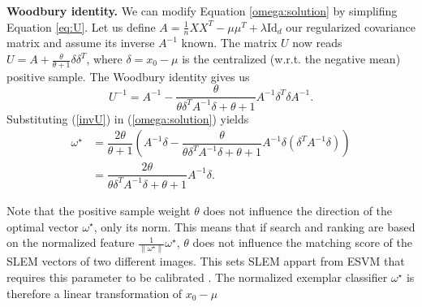 \textbf{Woodbury identity.} 
We can modify Equation \ref{omega:solution} by simplifing Equation \ref{eq:U}.
Let us define $A = \frac{1}{n}XX^T-\mu\mu^T +\lambda\mathrm{Id}_d$ our regularized covariance matrix and assume its inverse $A^{-1}$ known. 
The matrix $U$ now reads $U = A + \frac{\theta}{\theta+1}\delta\delta^T$, where $\delta=x_0-\mu$ is the centralized (w.r.t. the negative mean) positive sample. The Woodbury identity \cite{woodbury} gives us
\begin{equation}
U^{-1} = A^{-1} -\dfrac{\theta}{\theta\delta^TA^{-1}\delta+ \theta+1}A^{-1}\delta^T\delta A^{-1}. \label{invU}
\end{equation}
Substituting (\ref{invU}) in (\ref{omega:solution}) yields
\begin{equation}
\begin{split}
\omega^\star &= \dfrac{2\theta}{\theta +1}\left(A^{-1}\delta - \dfrac{\theta}{\theta\delta^TA^{-1}\delta+ \theta+1} A^{-1}\delta (\delta^TA^{-1}\delta)\right)\\
&= \dfrac{2\theta}{\theta\delta^TA^{-1}\delta+ \theta+1} A^{-1}\delta.\label{Wood:omega}
\end{split}
\end{equation}

Note that the positive sample weight $\theta$ does not influence the direction of the optimal vector $\omega^\star$, only its norm. This means that if search and ranking are based on the normalized feature $\frac{1}{\|\omega^\star\|}\omega^\star$, $\theta$ does not influence the matching score of the SLEM vectors of two different images. This sets SLEM appart from ESVM that requires this parameter to be calibrated \cite{Efros11,ZePe15}. The normalized exemplar classifier $\omega^\star$ is therefore a linear transformation of $x_0-\mu$

